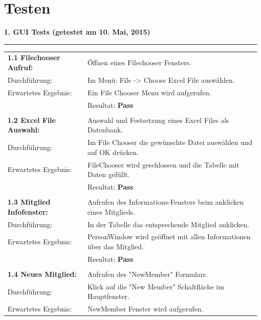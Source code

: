 \documentclass{article}
\begin{document}
\section{Testen}
\textbf{1. GUI Tests (getestet am 10. Mai, 2015)\\}
\rule[2mm]{1\linewidth}{0.3mm}
\begin{tabular}{l|p{12cm}}
	\textbf{1.1 Filechooser Aufruf:} & Öffnen eines Filechooser Fensters.\\
		Durchführung:			& Im Menü: File -> Choose Excel File auswählen.	\\			
		Erwartetes Ergebnis: 	& Ein File Chooser Menu wird aufgerufen. \\
								& Resultat:  \textbf{Pass}\hspace{8.4cm} \color{green} {\ding{51}} \\
		\\
	\textbf{1.2 Excel File Auswahl:} & Auswahl und Festsetzung eines Excel Files als Datenbank.\\
		Durchführung:			& 	Im File Chooser die gewünschte Datei auswählen und auf OK 		drücken.\\
		Erwartetes Ergebnis: 	&	FileChooser wird geschlossen und die Tabelle mit Daten gefüllt. \\
								& Resultat:  \textbf{Pass}\hspace{8.4cm} \color{green} {\ding{51}} \\
	\\
	\textbf{1.3 Mitglied Infofenster:} & Aufrufen des Informations-Fensters beim anklicken eines Mitglieds. \\
		Durchführung:			& In der Tabelle das entsprechende Mitglied anklicken. \\
		Erwartetes Ergebnis: 	& PersonWindow wird geöffnet mit allen Informationen über das Mitglied.\\
								& Resultat:  \textbf{Pass}\hspace{8.4cm} \color{green} {\ding{51}} \\
							\\
	\textbf{1.4 Neues Mitglied:} & Aufrufen des "NewMember" Formulars. \\
		Durchführung:			& Klick auf die "New Member" Schaltfläche im Hauptfenster.\\
		Erwartetes Ergebnis: 	& NewMember Fenster wird aufgerufen. \\

\end{tabular}
\end{document}
